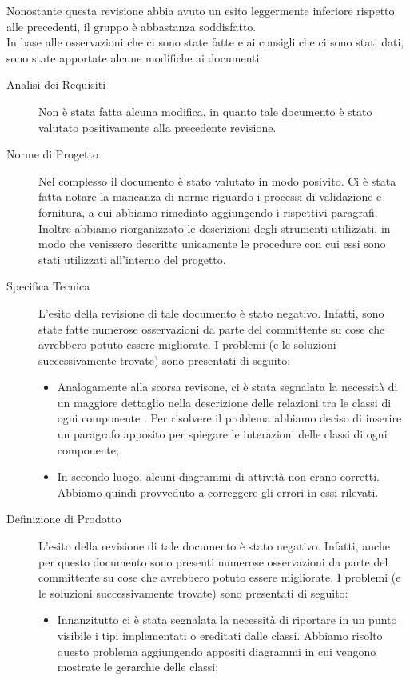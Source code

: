     Nonostante questa revisione abbia avuto un esito leggermente inferiore rispetto alle precedenti, il gruppo è abbastanza soddisfatto.\\
    In base alle osservazioni che ci sono state fatte e ai consigli che ci sono stati dati, sono state apportate alcune modifiche ai documenti.
    \begin{description}
        \item[Analisi dei Requisiti] Non è stata fatta alcuna modifica, in quanto tale documento è stato valutato positivamente alla precedente revisione.
        \item[Norme di Progetto] Nel complesso il documento è stato valutato in modo posivito. Ci è stata fatta notare la mancanza di norme riguardo i processi di validazione e fornitura, a cui abbiamo rimediato aggiungendo i rispettivi paragrafi. Inoltre abbiamo riorganizzato le descrizioni degli strumenti utilizzati, in modo che venissero descritte unicamente le procedure con cui essi sono stati utilizzati all'interno del progetto.   
        \item[Specifica Tecnica] L’esito della revisione di tale documento è stato negativo. Infatti, sono state fatte numerose osservazioni da parte del committente su cose che avrebbero potuto essere migliorate. I problemi (e le soluzioni successivamente trovate) sono presentati di seguito:
            \begin{itemize}
                \item Analogamente alla scorsa revisone, ci è stata segnalata la necessità di un maggiore dettaglio nella descrizione delle relazioni tra le classi di ogni componente . Per risolvere il problema abbiamo deciso di inserire un paragrafo apposito per spiegare le interazioni delle classi di ogni componente;
                \item In secondo luogo, alcuni diagrammi di attività non erano corretti. Abbiamo quindi provveduto a correggere gli errori in essi rilevati.
            \end{itemize}
    \item[Definizione di Prodotto] L’esito della revisione di tale documento è stato negativo. Infatti, anche per questo documento sono presenti numerose osservazioni da parte del committente su cose che avrebbero potuto essere migliorate. I problemi (e le soluzioni successivamente trovate) sono presentati di seguito:
            \begin{itemize}
                \item Innanzitutto ci è stata segnalata la necessità di riportare in un punto visibile i tipi implementati o ereditati dalle classi. Abbiamo risolto questo problema aggiungendo appositi diagrammi in cui vengono mostrate le gerarchie delle classi;

\end{itemize}
\end{description}
